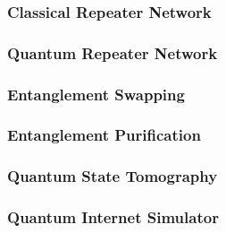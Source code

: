 \subsubsection{Classical Repeater Network}
\subsubsection{Quantum Repeater Network}
\subsubsection{Entanglement Swapping}
\subsubsection{Entanglement Purification}
\subsubsection{Quantum State Tomography}
\subsubsection{Quantum Internet Simulator}

